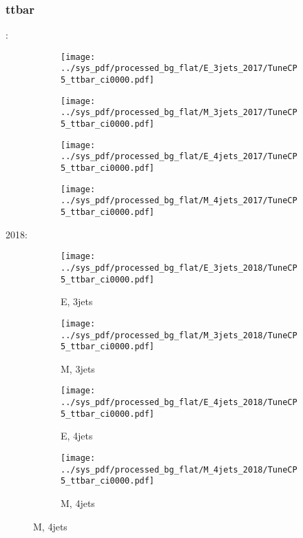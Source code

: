 \documentclass{beamer}
\begin{document}
\begin{frame}
\frametitle{ttbar}
\fontsize{5}{1}:
\begin{figure}
\centering
\begin{subfigure}[b]{0.24\textwidth}
\texttt{[image: ../sys\_pdf/processed\_bg\_flat/E\_3jets\_2017/TuneCP5\_ttbar\_ci0000.pdf]}
\end{subfigure}
\begin{subfigure}[b]{0.24\textwidth}
\texttt{[image: ../sys\_pdf/processed\_bg\_flat/M\_3jets\_2017/TuneCP5\_ttbar\_ci0000.pdf]}
\end{subfigure}
\begin{subfigure}[b]{0.24\textwidth}
\texttt{[image: ../sys\_pdf/processed\_bg\_flat/E\_4jets\_2017/TuneCP5\_ttbar\_ci0000.pdf]}
\end{subfigure}
\begin{subfigure}[b]{0.24\textwidth}
\texttt{[image: ../sys\_pdf/processed\_bg\_flat/M\_4jets\_2017/TuneCP5\_ttbar\_ci0000.pdf]}
\end{subfigure}
\end{figure}
2018:
\begin{figure}
\centering
\begin{subfigure}[b]{0.24\textwidth}
\texttt{[image: ../sys\_pdf/processed\_bg\_flat/E\_3jets\_2018/TuneCP5\_ttbar\_ci0000.pdf]}
\captionsetup{font=tiny}
\caption{E, 3jets}
\end{subfigure}
\begin{subfigure}[b]{0.24\textwidth}
\texttt{[image: ../sys\_pdf/processed\_bg\_flat/M\_3jets\_2018/TuneCP5\_ttbar\_ci0000.pdf]}
\captionsetup{font=tiny}
\caption{M, 3jets}
\end{subfigure}
\begin{subfigure}[b]{0.24\textwidth}
\texttt{[image: ../sys\_pdf/processed\_bg\_flat/E\_4jets\_2018/TuneCP5\_ttbar\_ci0000.pdf]}
\captionsetup{font=tiny}
\caption{E, 4jets}
\end{subfigure}
\begin{subfigure}[b]{0.24\textwidth}
\texttt{[image: ../sys\_pdf/processed\_bg\_flat/M\_4jets\_2018/TuneCP5\_ttbar\_ci0000.pdf]}
\captionsetup{font=tiny}
\caption{M, 4jets}
\end{subfigure}
\end{figure}
\end{frame}
\end{document}
